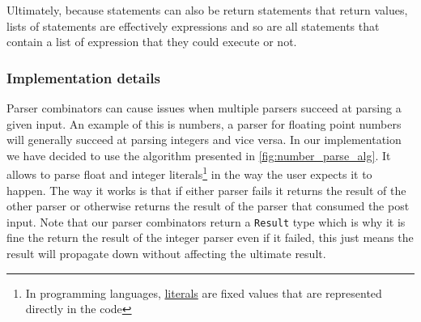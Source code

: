 \documentclass{article}
\begin{document}
Ultimately, because statements can also be return statements that return
values, lists of statements are effectively expressions and so are all
statements that contain a list of expression that they could execute or not.

\subsubsection{Implementation details}

Parser combinators can cause issues when multiple parsers succeed at parsing a
given input. An example of this is numbers, a parser for floating point numbers
will generally succeed at parsing integers and vice versa. In our
implementation we have decided to use the algorithm presented in
\autoref{fig:number_parse_alg}. It allows to parse float and integer
literals\footnote{In programming languages,
\href{https://en.wikipedia.org/wiki/Literal_(computer_programming)}{literals}
are fixed values that are represented directly in the code} in the way the user
expects it to happen. The way it works is that if either parser fails it
returns the result of the other parser or otherwise returns the result of the
parser that consumed the post input. Note that our parser combinators return a
\texttt{Result} type which is why it is fine the return the result of the
integer parser even if it failed, this just means the result will propagate
down without affecting the ultimate result.
\end{document}
